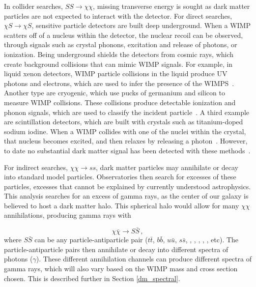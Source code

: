     In collider searches, $SS \rightarrow \chi\chi$, missing transverse energy is sought as dark matter particles are not expected to interact with the detector.
    For direct searches, $\chi S \rightarrow \chi S$, sensitive particle detectors are built deep underground.
    When a WIMP scatters off of a nucleus within the detector, the nuclear recoil can be observed, through signals such as crystal phonons, excitation and release of photons, or ionization.
    Being underground shields the detectors from cosmic rays, which create background collisions that can mimic WIMP signals.
    For example, in liquid xenon detectors, WIMP particle collisions in the liquid produce UV photons and electrons, which are used to infer the presence of the WIMPS~\cite{direct_lux,direct_xenon}.
    Another type are cryogenic, which use pucks of germanium and silicon to measure WIMP collisions.
    These collisions produce detectable ionization and phonon signals, which are used to classify the incident particle~\cite{direct_cdms}.
    A third example are scintillation detectors, which are built with crystals such as titanium-doped sodium iodine.
    When a WIMP collides with one of the nuclei within the crystal, that nucleus becomes excited, and then relaxes by releasing a photon~\cite{direct_dama}.
    However, to date no substantial dark matter signal has been detected with these methods~\cite{direct_dm_detection}.
    
    For indirect searches, $\chi\chi \rightarrow ss$, dark matter particles may annihilate or decay into standard model particles.
    Observatories then search for excesses of these particles, excesses that cannot be explained by currently understood astrophysics.
    This analysis searches for an excess of gamma rays, as the center of our galaxy is believed to host a dark matter halo.
    This spherical halo would allow for many $\chi\chi$ annihilations, producing gamma rays with
    
    $$\chi\bar{\chi} \rightarrow S\bar{S} \,,$$
    where $S\bar{S}$ can be any particle-antiparticle pair ($t\bar{t}$, $b\bar{b}$, $u\bar{u}$, $s\bar{s}$, \Pelectron{}\APelectron{}, \Pnue{}\APnue{}, \Pgg{}\Pgg{}, \Pg{}\Pg{}, \PHiggslight{}\PHiggslight{}, etc).
    The particle-antiparticle pairs then annihilate or decay into different spectra of photons ($\gamma$).
    These different annihilation channels can produce different spectra of gamma rays, which will also vary based on the WIMP mass and cross section chosen.
    This is described further in Section \ref{dm_spectral}.

